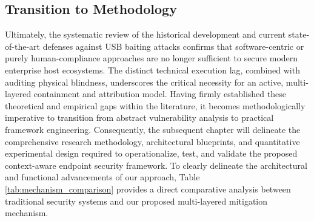 \documentclass{ieeeaccess}
\begin{document}
\subsection{Transition to Methodology}
Ultimately, the systematic review of the historical development and current state-of-the-art defenses against USB baiting attacks confirms that software-centric or purely human-compliance approaches are no longer sufficient to secure modern enterprise host ecosystems. The distinct technical execution lag, combined with auditing physical blindness, underscores the critical necessity for an active, multi-layered containment and attribution model. Having firmly established these theoretical and empirical gaps within the literature, it becomes methodologically imperative to transition from abstract vulnerability analysis to practical framework engineering. Consequently, the subsequent chapter will delineate the comprehensive research methodology, architectural blueprints, and quantitative experimental design required to operationalize, test, and validate the proposed context-aware endpoint security framework. To clearly delineate the architectural and functional advancements of our approach, Table \ref{tab:mechanism_comparison} provides a direct comparative analysis between traditional security systems and our proposed multi-layered mitigation mechanism.

\begin{table}[htbp]
\centering
\caption{Comparative Analysis of Traditional and Proposed Mechanisms}
 \label{tab:mechanism_comparison}

\end{table}
\end{document}
